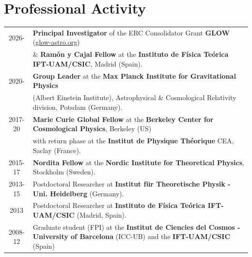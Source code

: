 \documentclass[11pt,a4paper]{article}
\begin{document}
\section*{Professional Activity}
\vspace{-0.3cm}
\begin{longtable}{c p{15.5 cm}}
2026- &
\textbf{Principal Investigator} of the ERC Consolidator Grant \textbf{GLOW} (\href{https://glow-astro.org/}{glow-astro.org}) \\ & \& \textbf{Ram\'on y Cajal Fellow} at the \textbf{Instituto de F\'isica Te\'orica IFT-UAM/CSIC}, Madrid (Spain). \\[3pt]
2020- & 
\textbf{Group Leader} at the \textbf{Max Planck Institute for Gravitational Physics} \\ & (Albert Einstein Institute), {Astrophysical \& Cosmological Relativity division}, Potsdam (Germany). \\[3pt]
2017-20 & \textbf{Marie Curie Global Fellow} at the \textbf{Berkeley Center for Cosmological Physics}, Berkeley (US) \\ & with return phase at the \textbf{Institut de Physique Th\'eorique} CEA, Saclay (France). 
\\[3pt]
2015-17 & \textbf{Nordita Fellow} at the \textbf{Nordic Institute for Theoretical Physics}, Stockholm (Sweden).
\\[3pt]
2013-15 & Postdoctoral  Researcher at \textbf{Institut f\"ur Theoretische Physik - Uni. Heidelberg} (Germany). 
\\[3pt]
2013 & Postdoctoral Researcher at \textbf{Instituto de F\'isica Te\'orica IFT-UAM/CSIC}
(Madrid, Spain).
\\[3pt]
2008-12 & Graduate student (FPI) at the \textbf{Institut de Ciencies del Cosmos - University of Barcelona} (ICC-UB) and the \textbf{IFT-UAM/CSIC} (Spain) 
\end{longtable}
\end{document}
